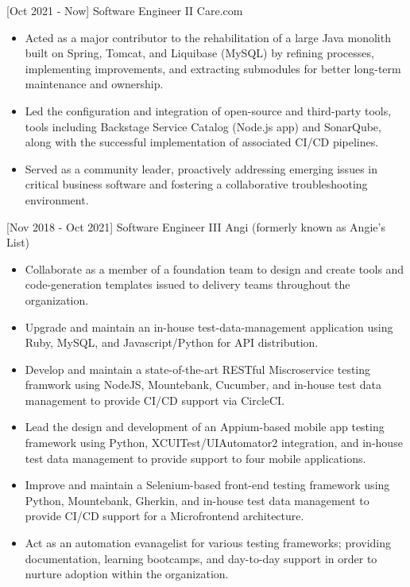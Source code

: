 \documentclass[]{moak-resume}
\begin{document}
  \begin{entrylist}
    \entry
    {[Oct 2021 - Now]}
    {Software Engineer II}
    {Care.com}
    {}
  \end{entrylist}
  \begin{itemize}
    \setlength\itemsep{-0.4em}
    \item \small\bodyfont Acted as a major contributor to the rehabilitation of a large Java monolith built on Spring, Tomcat, and Liquibase (MySQL) by refining processes, implementing improvements, and extracting submodules for better long-term maintenance and ownership.
    \item \small\bodyfont Led the configuration and integration of open-source and third-party tools, tools including Backstage Service Catalog (Node.js app) and SonarQube, along with the successful implementation of associated CI/CD pipelines.
    \item \small\bodyfont Served as a community leader, proactively addressing emerging issues in critical business software and fostering a collaborative troubleshooting environment.
    \newline
  \end{itemize}  

 \begin{entrylist}
  \entry
    {[Nov 2018 - Oct 2021]}
    {Software Engineer III}
    {Angi (formerly known as Angie's List)}
    {}
\end{entrylist}
\begin{itemize}
  \setlength\itemsep{-0.4em}
  \item \small\bodyfont Collaborate as a member of a foundation team to design and create tools and code-generation templates issued to delivery teams throughout the organization.
  \item \small\bodyfont Upgrade and maintain an in-house test-data-management application using Ruby, MySQL, and Javascript/Python for API distribution.
  \item \small\bodyfont Develop and maintain a state-of-the-art RESTful Miscroservice testing framwork using NodeJS, Mountebank, Cucumber, and in-house test data management to provide CI/CD support via CircleCI.
  \item \small\bodyfont Lead the design and development of an Appium-based mobile app testing framework using Python, XCUITest/UIAutomator2 integration, and in-house test data management to provide support to four mobile applications.
  \item \small\bodyfont Improve and maintain a Selenium-based front-end testing framework using Python, Mountebank, Gherkin, and in-house test data management to provide CI/CD support for a Microfrontend architecture.
  \item \small\bodyfont Act as an automation evanagelist for various testing frameworks; providing documentation, learning bootcamps, and day-to-day support in order to nurture adoption within the organization.
  \newline
\end{itemize}
\end{document}
